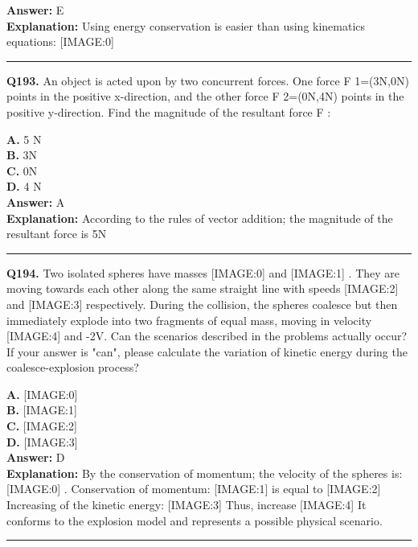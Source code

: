 \documentclass[12pt]{article}
\begin{document}
\textbf{Answer:} E \\
\textbf{Explanation:} Using energy conservation is easier than using kinematics equations:
[IMAGE:0]

\hrule
\vspace{1em}


\noindent
\textbf{Q193.} An object is acted upon by two concurrent forces. One force
F
1​​=(3N,0N) points in the positive x-direction, and the other force
F
2​​=(0N,4N) points in the positive y-direction. Find the magnitude of the resultant force
F
:



\textbf{A.} 5
N \\
\textbf{B.} 3N \\
\textbf{C.} 0N \\
\textbf{D.} 4
N \\

\textbf{Answer:} A \\
\textbf{Explanation:} According to the rules of vector addition; the magnitude of the resultant force is 5N

\hrule
\vspace{1em}


\noindent
\textbf{Q194.} Two isolated spheres have masses
[IMAGE:0]
and
[IMAGE:1]
. They are moving towards each other along the same straight line with speeds
[IMAGE:2]
and
[IMAGE:3]
respectively. During the collision, the spheres coalesce but then immediately explode into two fragments of equal mass, moving in velocity
[IMAGE:4]
and -2V. Can the scenarios described in the problems actually occur? If your answer is "can", please calculate the variation of kinetic energy during the coalesce-explosion process?



\textbf{A.} [IMAGE:0] \\
\textbf{B.} [IMAGE:1] \\
\textbf{C.} [IMAGE:2] \\
\textbf{D.} [IMAGE:3] \\

\textbf{Answer:} D \\
\textbf{Explanation:} By the conservation of momentum; the velocity of the spheres is:
[IMAGE:0]
.
Conservation of momentum:
[IMAGE:1]
is equal to
[IMAGE:2]
Increasing of the kinetic energy:
[IMAGE:3]
Thus, increase
[IMAGE:4]
It conforms to the explosion model and represents a possible physical scenario.

\hrule
\vspace{1em}
\end{document}
